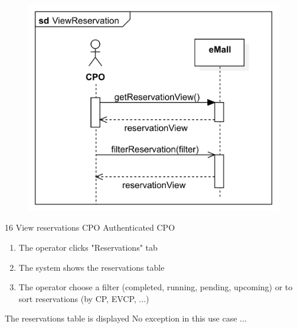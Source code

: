 \usecase
{
    \begin{figure}[H]
        \centering
        \includegraphics[scale=0.9]{src/sequence_diagram/ViewReservation.png}
    \end{figure}
}
{16}
{View reservations} %
{CPO} %
{Authenticated CPO} %
{ %
    \begin{enumerate}

        \item The operator clicks "Reservations" tab
        \item The system shows the reservations table
        \item The operator choose a filter (completed, running, pending, upcoming) or to sort reservations (by CP, EVCP, ...)
    \end{enumerate}
}
{The reservations table is displayed} %
{ %
    No exception in this use case
}
{ %
    ...
}


